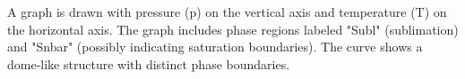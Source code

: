 A graph is drawn with pressure (p) on the vertical axis and temperature (T) on the horizontal axis. The graph includes phase regions labeled "Subl" (sublimation) and "Snbar" (possibly indicating saturation boundaries). The curve shows a dome-like structure with distinct phase boundaries.